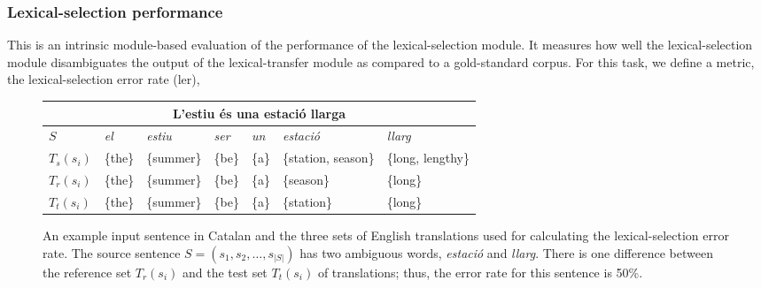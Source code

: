 \documentclass[11pt]{article}
\begin{document}
\label{sec:eval-metrics}
\subsubsection{Lexical-selection performance}
This is an intrinsic module-based evaluation of the performance of the
lexical-selection module.  It measures how well the lexical-selection
module disambiguates the output of the lexical-transfer module as
compared to a gold-standard corpus. For this task, we define a metric,
the lexical-selection error rate ({\sc ler}),
\begin{figure*}
\begin{center}
\setlength\tabcolsep{5.2pt}%
 \begin{tabular}{|l|llllll|}
   \hline
   \multicolumn{7}{|c|}{L'estiu \'{e}s una estaci\'{o} llarga}\\
   \hline
   $S$        & \emph{el} & \emph{estiu} & \emph{ser} & \emph{un} & \emph{estaci\'{o}} & \emph{llarg} \\
   \hline
   $T_s(s_i)$ & \{the\} & \{summer\} & \{be\} & \{a\} & \{station, season\} &  \{long, lengthy\} \\
   \hline 
   $T_r(s_i)$ & \{the\} & \{summer\} & \{be\} & \{a\} &  \{season\} & \{long\} \\
   \hline
   $T_t(s_i)$ & \{the\} & \{summer\} & \{be\} & \{a\} &  \{station\} & \{long\} \\
   \hline
 \end{tabular}
 \caption{An example input sentence in Catalan and the three sets of
   English translations used for calculating the lexical-selection
   error rate. The source sentence $S = (s_1, s_2, \ldots, s_{|S|})$
   has two ambiguous words, \emph{estaci\'{o}} and \emph{llarg}. There is one difference
   between the reference set $T_r(s_i)$ and the test set $T_t(s_i)$ of
   translations; thus, the error rate for this sentence is
   50\%.}
\label{fig:ler-example}
\end{center}
\end{figure*}

\end{document}
